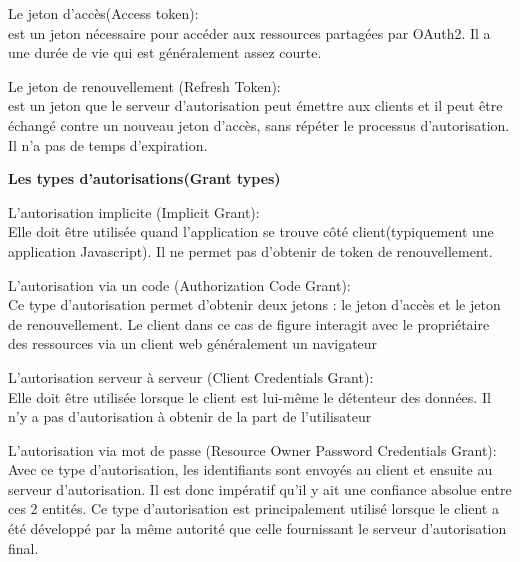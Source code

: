 \begin{list}{•}
	\item Le jeton d’accès(Access token):\\
	 est un jeton nécessaire pour accéder aux ressources partagées par
	OAuth2. Il a une durée de vie qui est généralement assez courte.
	\item  
	\item Le jeton de renouvellement (Refresh Token):\\
	 est un jeton que le serveur d’autorisation peut émettre aux clients et il peut être échangé contre un nouveau jeton d’accès, sans répéter le processus d’autorisation. Il n’a pas de temps d’expiration.
\end{list}

\textbf{Les types d’autorisations(Grant types)}

\begin{list}{•}
	\item L’autorisation implicite (Implicit Grant): \\
	Elle doit être utilisée quand l’application se trouve côté
	client(typiquement une application Javascript). Il ne permet pas d’obtenir de token de renouvellement.
	\item L’autorisation via un code (Authorization Code Grant): \\
	Ce type d’autorisation permet d’obtenir deux jetons : le jeton d’accès et le jeton de renouvellement. Le client dans ce cas de figure interagit
	avec le propriétaire des ressources via un client web généralement un navigateur
	\item L’autorisation serveur à serveur (Client Credentials Grant):\\
	 Elle doit être utilisée lorsque le client est lui-même le détenteur des données. Il n’y a pas d’autorisation à obtenir de la part de l’utilisateur
	 \item L’autorisation via mot de passe (Resource Owner Password Credentials Grant):\\
	 Avec ce type d’autorisation, les identifiants sont envoyés au client et ensuite au serveur d’autorisation. Il est donc
	 impératif qu’il y ait une confiance absolue entre ces 2 entités. Ce type d’autorisation est principalement utilisé lorsque le client a été développé par la même autorité que celle fournissant le serveur
	 d’autorisation final.
\end{list}


